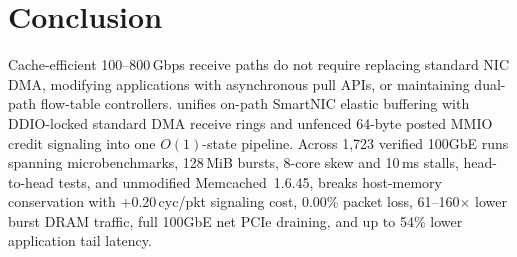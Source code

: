 \section{Conclusion}
\label{sec:conclusion}

Cache-efficient 100--800\,Gbps receive paths do not require replacing standard
NIC DMA, modifying applications with asynchronous pull APIs, or maintaining
dual-path flow-table controllers. \sys{} unifies on-path SmartNIC elastic
buffering with DDIO-locked standard DMA receive rings and unfenced 64-byte
posted MMIO credit signaling into one $O(1)$-state pipeline. Across 1,723
verified 100GbE runs spanning microbenchmarks, 128\,MiB bursts, 8-core skew and
10\,ms stalls, head-to-head \ceio{} tests, and unmodified Memcached~1.6.45,
\sys{} breaks host-memory conservation with +0.20\,cyc/pkt signaling cost,
0.00\% packet loss, 61--160$\times$ lower burst DRAM traffic, full 100GbE net
PCIe draining, and up to 54\% lower application tail latency.
